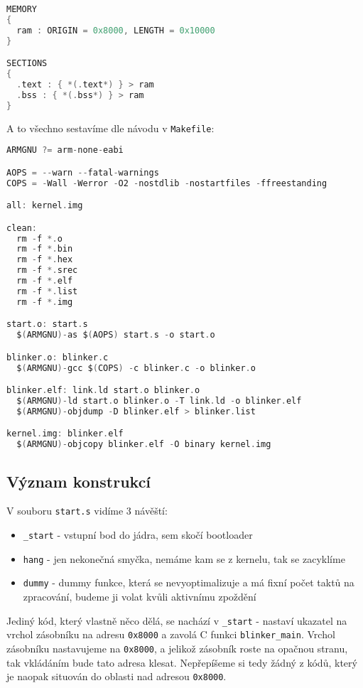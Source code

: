 \documentclass{article}
\begin{document}
\begin{lstlisting}[language=C]
MEMORY
{
  ram : ORIGIN = 0x8000, LENGTH = 0x10000
}

SECTIONS
{
  .text : { *(.text*) } > ram
  .bss : { *(.bss*) } > ram
}
\end{lstlisting}

A to všechno sestavíme dle návodu v \texttt{Makefile}:

\begin{lstlisting}[language=C]
ARMGNU ?= arm-none-eabi

AOPS = --warn --fatal-warnings
COPS = -Wall -Werror -O2 -nostdlib -nostartfiles -ffreestanding

all: kernel.img

clean:
  rm -f *.o
  rm -f *.bin
  rm -f *.hex
  rm -f *.srec
  rm -f *.elf
  rm -f *.list
  rm -f *.img

start.o: start.s
  $(ARMGNU)-as $(AOPS) start.s -o start.o

blinker.o: blinker.c
  $(ARMGNU)-gcc $(COPS) -c blinker.c -o blinker.o

blinker.elf: link.ld start.o blinker.o
  $(ARMGNU)-ld start.o blinker.o -T link.ld -o blinker.elf
  $(ARMGNU)-objdump -D blinker.elf > blinker.list

kernel.img: blinker.elf
  $(ARMGNU)-objcopy blinker.elf -O binary kernel.img
\end{lstlisting}

\subsection{Význam konstrukcí}

V souboru \texttt{start.s} vidíme 3 návěští:
\begin{itemize}
	\item \texttt{\_start} - vstupní bod do jádra, sem skočí bootloader
	\item \texttt{hang} - jen nekonečná smyčka, nemáme kam se  z kernelu, tak se zacyklíme
	\item \texttt{dummy} - dummy funkce, která se nevyoptimalizuje a má fixní počet taktů na zpracování, budeme ji volat kvůli aktivnímu zpoždění
\end{itemize}

Jediný kód, který vlastně něco dělá, se nachází v \texttt{\_start} - nastaví ukazatel na vrchol zásobníku na adresu \texttt{0x8000} a zavolá C funkci \texttt{blinker\_main}. Vrchol zásobníku nastavujeme na \texttt{0x8000}, a jelikož zásobník roste na opačnou stranu, tak vkládáním bude tato adresa klesat. Nepřepíšeme si tedy žádný z kódů, který je naopak situován do oblasti nad adresou \texttt{0x8000}.
\end{document}
